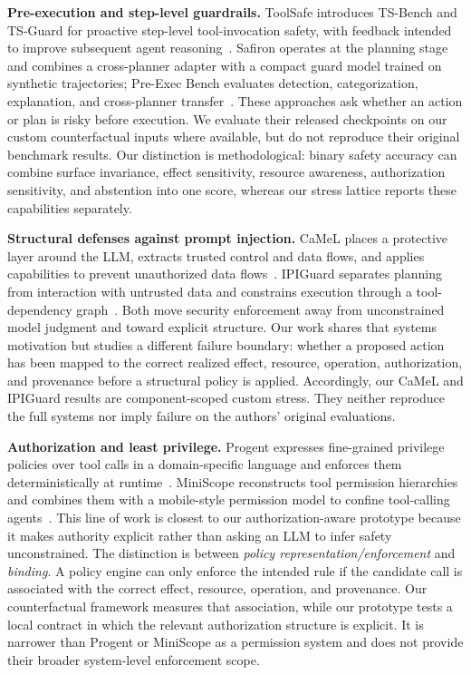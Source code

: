 \documentclass[10pt,twocolumn]{article}
\begin{document}
\textbf{Pre-execution and step-level guardrails.}
ToolSafe introduces TS-Bench and TS-Guard for proactive step-level tool-invocation safety, with feedback intended to improve subsequent agent reasoning~\cite{toolsafe}. Safiron operates at the planning stage and combines a cross-planner adapter with a compact guard model trained on synthetic trajectories; Pre-Exec Bench evaluates detection, categorization, explanation, and cross-planner transfer~\cite{safiron}. These approaches ask whether an action or plan is risky before execution. We evaluate their released checkpoints on our custom counterfactual inputs where available, but do not reproduce their original benchmark results. Our distinction is methodological: binary safety accuracy can combine surface invariance, effect sensitivity, resource awareness, authorization sensitivity, and abstention into one score, whereas our stress lattice reports these capabilities separately.

\textbf{Structural defenses against prompt injection.}
CaMeL places a protective layer around the LLM, extracts trusted control and data flows, and applies capabilities to prevent unauthorized data flows~\cite{camel}. IPIGuard separates planning from interaction with untrusted data and constrains execution through a tool-dependency graph~\cite{ipiguard}. Both move security enforcement away from unconstrained model judgment and toward explicit structure. Our work shares that systems motivation but studies a different failure boundary: whether a proposed action has been mapped to the correct realized effect, resource, operation, authorization, and provenance before a structural policy is applied. Accordingly, our CaMeL and IPIGuard results are component-scoped custom stress. They neither reproduce the full systems nor imply failure on the authors' original evaluations.

\textbf{Authorization and least privilege.}
Progent expresses fine-grained privilege policies over tool calls in a domain-specific language and enforces them deterministically at runtime~\cite{progent}. MiniScope reconstructs tool permission hierarchies and combines them with a mobile-style permission model to confine tool-calling agents~\cite{miniscope}. This line of work is closest to our authorization-aware prototype because it makes authority explicit rather than asking an LLM to infer safety unconstrained. The distinction is between \emph{policy representation/enforcement} and \emph{binding}. A policy engine can only enforce the intended rule if the candidate call is associated with the correct effect, resource, operation, and provenance. Our counterfactual framework measures that association, while our prototype tests a local contract in which the relevant authorization structure is explicit. It is narrower than Progent or MiniScope as a permission system and does not provide their broader system-level enforcement scope.
\end{document}

